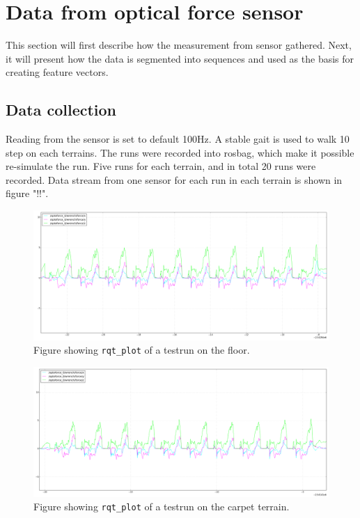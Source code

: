 \documentclass[USenglish]{ifimaster}  %
\begin{document}
\section{Data from optical force sensor}
This section will first describe how the measurement from sensor gathered. Next, it will present how the data is segmented into sequences and used as the basis for creating feature vectors.

\subsection{Data collection}
Reading from the sensor is set to default 100Hz. A stable gait is used to walk 10 step on each terrains. The runs were recorded into rosbag, which make it possible re-simulate the run. Five runs for each terrain, and in total 20 runs were recorded. Data stream from one sensor for each run in each terrain is shown in figure "!!".

\begin{figure}[h]
	\centering
	\includegraphics[width=\textwidth,height=\textheight,keepaspectratio]{Figures/gulvgraf}
	\caption{Figure showing \texttt{rqt\_plot} of a testrun on the floor.}
	\label{fig:graphf}
\end{figure}

\begin{figure}[h]
	\centering
	\includegraphics[width=\textwidth,height=\textheight,keepaspectratio]{Figures/teppegraf}
	\caption{Figure showing \texttt{rqt\_plot} of a testrun on the carpet terrain.}
	\label{fig:grapht}
\end{figure}
\end{document}
